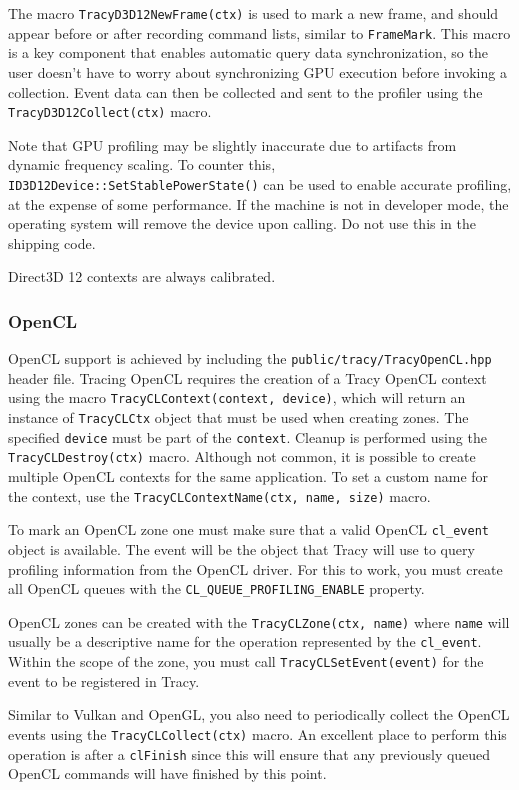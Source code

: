 \documentclass[hidelinks,titlepage,a4paper,twoside]{article}
\begin{document}
The macro \texttt{TracyD3D12NewFrame(ctx)} is used to mark a new frame, and should appear before or after recording command lists, similar to \texttt{FrameMark}. This macro is a key component that enables automatic query data synchronization, so the user doesn't have to worry about synchronizing GPU execution before invoking a collection. Event data can then be collected and sent to the profiler using the \texttt{TracyD3D12Collect(ctx)} macro.

Note that GPU profiling may be slightly inaccurate due to artifacts from dynamic frequency scaling. To counter this, \texttt{ID3D12Device::SetStablePowerState()} can be used to enable accurate profiling, at the expense of some performance. If the machine is not in developer mode, the operating system will remove the device upon calling. Do not use this in the shipping code.

Direct3D 12 contexts are always calibrated.

\subsubsection{OpenCL}

OpenCL support is achieved by including the \texttt{public/tracy/TracyOpenCL.hpp} header file. Tracing OpenCL requires the creation of a Tracy OpenCL context using the macro \texttt{TracyCLContext(context, device)}, which will return an instance of \texttt{TracyCLCtx} object that must be used when creating zones. The specified \texttt{device} must be part of the \texttt{context}. Cleanup is performed using the \texttt{TracyCLDestroy(ctx)} macro. Although not common, it is possible to create multiple OpenCL contexts for the same application. To set a custom name for the context, use the \texttt{TracyCLContextName(ctx, name, size)} macro.

To mark an OpenCL zone one must make sure that a valid OpenCL \texttt{cl\_event} object is available. The event will be the object that Tracy will use to query profiling information from the OpenCL driver. For this to work, you must create all OpenCL queues with the \texttt{CL\_QUEUE\_PROFILING\_ENABLE} property.

OpenCL zones can be created with the \texttt{TracyCLZone(ctx, name)} where \texttt{name} will usually be a descriptive name for the operation represented by the \texttt{cl\_event}. Within the scope of the zone, you must call \texttt{TracyCLSetEvent(event)} for the event to be registered in Tracy.

Similar to Vulkan and OpenGL, you also need to periodically collect the OpenCL events using the \texttt{TracyCLCollect(ctx)} macro. An excellent place to perform this operation is after a \texttt{clFinish} since this will ensure that any previously queued OpenCL commands will have finished by this point.
\end{document}
